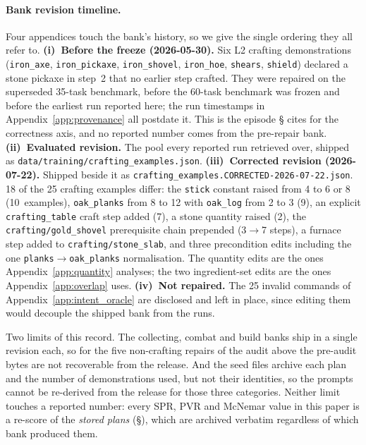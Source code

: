 \documentclass[letterpaper]{article} %
\newcommand{\appref}[1]{Appendix~\ref{#1}}
\newcommand{\bodyref}[1]{\getrefnumber{#1}}
\begin{document}
\paragraph{Bank revision timeline.}  Four appendices touch the bank's history,
so we give the single ordering they all refer to.  \textbf{(i)~Before the
freeze (2026-05-30).}  Six L2 crafting demonstrations
(\texttt{iron\_axe}, \texttt{iron\_pickaxe}, \texttt{iron\_shovel},
\texttt{iron\_hoe}, \texttt{shears}, \texttt{shield}) declared a stone pickaxe
in step~2 that no earlier step crafted.  They were repaired on the superseded
35-task benchmark, before the 60-task benchmark was frozen and before the
earliest run reported here; the run timestamps in
\appref{app:provenance} all postdate it.  This is the episode
\S\bodyref{sec:knowledge_gap} cites for the correctness axis, and no reported
number comes from the pre-repair bank.  \textbf{(ii)~Evaluated revision.}  The
pool every reported run retrieved over, shipped as
\texttt{data/training/crafting\_examples.json}.  \textbf{(iii)~Corrected
revision (2026-07-22).}  Shipped beside it as
\texttt{crafting\_examples.CORRECTED-2026-07-22.json}.  18 of the 25 crafting
examples differ: the \texttt{stick} constant raised from 4 to 6 or 8
(10~examples), \texttt{oak\_planks} from 8 to 12 with \texttt{oak\_log} from 2
to 3 (9), an explicit \texttt{crafting\_table} craft step added (7), a stone
quantity raised (2), the \texttt{crafting/gold\_shovel} prerequisite chain
prepended (3$\to$7 steps), a furnace step added to
\texttt{crafting/stone\_slab}, and three precondition edits including the one
\texttt{planks}$\to$\texttt{oak\_planks} normalisation.  The quantity edits are
the ones \appref{app:quantity} analyses; the two ingredient-set edits are the
ones \appref{app:overlap} uses.  \textbf{(iv)~Not repaired.}  The 25 invalid
commands of \appref{app:intent_oracle} are disclosed and left in place, since
editing them would decouple the shipped bank from the runs.

Two limits of this record.  The collecting, combat and build banks ship in a
single revision each, so for the five non-crafting repairs of the audit above
the pre-audit bytes are not recoverable from the release.  And the seed files
archive each plan and the number of demonstrations used, but not their
identities, so the prompts cannot be re-derived from the release for those
three categories.  Neither limit touches a reported number: every SPR, PVR and
McNemar value in this paper is a re-score of the \emph{stored plans}
(\S\bodyref{sec:protocol}), which are archived verbatim regardless of which bank
produced them.
\end{document}
